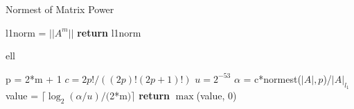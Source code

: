 \begin{algorithm}
	\caption{Normest of Matrix Power} 
	\begin{algorithmic}[1]
        \State l1norm = $||A^{m}||$ 
        \State \textbf{return} l1norm 
        \EndProcedure
	\end{algorithmic} 
\end{algorithm}

\begin{algorithm}
	\caption{ell} 
	\begin{algorithmic}[1]
        \State p = 2*m + 1
        \State $c = {2p!}/((2p)!(2p+1)!)$ 
        \State $u = 2^{-53}$ 
        \State $\alpha$ = c*normest($|A|, p$)/$|A|_{l_{1}}$
        \State value = $\lceil \log_{2}({\alpha/u})/($2*m$)\rceil$
        \State \textbf{return} $\max$(value, 0)
        \EndProcedure
	\end{algorithmic} 
\end{algorithm}

